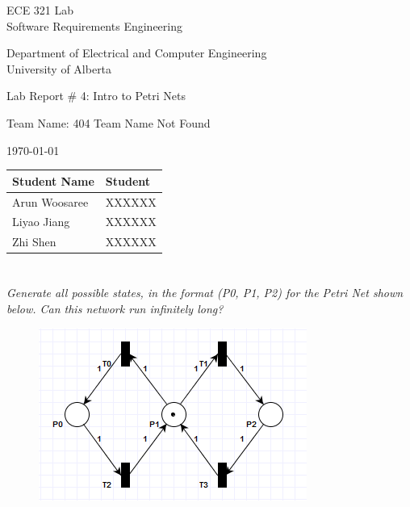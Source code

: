 \documentclass[letterpaper]{article}
\begin{document}
\begin{titlepage}
 \begin{center}

  \LARGE
  ECE 321 Lab\\ Software Requirements Engineering

  Department of Electrical and Computer Engineering\\

  University of Alberta

  \vspace{2cm}

  Lab Report \# 4: Intro to Petri Nets

  \vspace{2cm}

  Team Name: 404 Team Name Not Found

  \vspace{2cm}

  \today

  \vspace{2cm}
  \Large

  \begin{tabular}{ | m{5cm} | m{5cm} | }
   \hline
   Student Name  & Student \\
   \hline
   Arun Woosaree & XXXXXX  \\
   \hline
   Liyao Jiang   & XXXXXX  \\
   \hline
   Zhi Shen      & XXXXXX  \\
   \hline
  \end{tabular}



 \end{center}
\end{titlepage}


\section{}

\textit{Generate all possible states, in the format (P0, P1, P2) for the Petri Net shown below. Can this network run infinitely long?}

\begin{figure}[H]
 \centering
 \includegraphics[width=\textwidth]{image1.png}
\end{figure}
\end{document}

